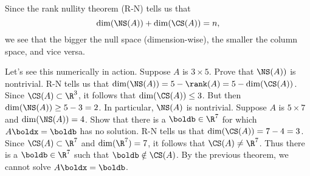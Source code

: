 \begin{frame}
Since the rank nullity theorem (R-N) tells us that 
\[
\dim(\NS(A))+\dim(\CS(A))=n,
\]
we see that the {\color{red} bigger} the null space (dimension-wise), the {\color{blue} smaller} the column space, and vice versa. 

Let's see this numerically in action. 
\bb
\pause\ii Suppose $A$ is $3\times 5$. Prove that $\NS(A))$ is nontrivial. 
\bpause
R-N tells us that $\dim(\NS(A))=5-\rank(A)=5-\dim(\CS(A))$. Since $\CS(A)\subset\R^3$, it follows that $\dim(\CS(A))\leq 3$. 
\bpause 
But then $\dim(\NS(A))\geq 5-3=2$. In particular, $\NS(A)$ is nontrivial. 
\pause\ii Suppose $A$ is $5\times 7$ and $\dim(\NS(A))=4$. Show that there is a $\boldb\in\R^7$ for which $A\boldx=\boldb$ has no solution. 
\bpause 
R-N tells us that $\dim(\CS(A))=7-4=3$. Since $\CS(A)\subset\R^7$ and $\dim(\R^7)=7$, it follows that $\CS(A)\ne \R^7$. 
\bpause
Thus there is a $\boldb\in\R^7$ such that $\boldb\notin\CS(A)$. By the previous theorem, we cannot solve $A\boldx=\boldb$. 
\ee
\end{frame}

